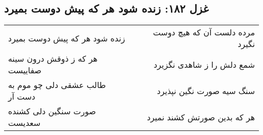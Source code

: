 \begin{center}
\section*{غزل ۱۸۲: زنده شود هر که پیش دوست بمیرد}
\label{sec:182}
\begin{longtable}{l p{0.5cm} r}
زنده شود هر که پیش دوست بمیرد
&&
مرده دلست آن که هیچ دوست نگیرد
\\
هر که ز ذوقش درون سینه صفاییست
&&
شمع دلش را ز شاهدی نگزیرد
\\
طالب عشقی دلی چو موم به دست آر
&&
سنگ سیه صورت نگین نپذیرد
\\
صورت سنگین دلی کشنده سعدیست
&&
هر که بدین صورتش کشند نمیرد
\\
\end{longtable}
\end{center}

